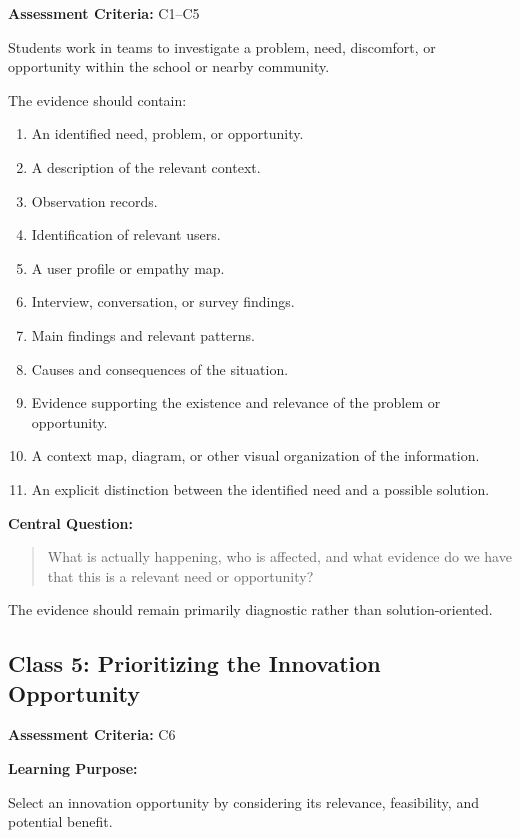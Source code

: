 \documentclass[12pt,a4paper]{article}
\begin{document}
	\textbf{Assessment Criteria:} C1--C5
	
	Students work in teams to investigate a problem, need, discomfort, or opportunity within the school or nearby community.
	
	The evidence should contain:
	
	\begin{enumerate}
		\item An identified need, problem, or opportunity.
		\item A description of the relevant context.
		\item Observation records.
		\item Identification of relevant users.
		\item A user profile or empathy map.
		\item Interview, conversation, or survey findings.
		\item Main findings and relevant patterns.
		\item Causes and consequences of the situation.
		\item Evidence supporting the existence and relevance of the problem or opportunity.
		\item A context map, diagram, or other visual organization of the information.
		\item An explicit distinction between the identified need and a possible solution.
	\end{enumerate}
	
	\textbf{Central Question:}
	
	\begin{quote}
		What is actually happening, who is affected, and what evidence do we have that this is a relevant need or opportunity?
	\end{quote}
	
	The evidence should remain primarily diagnostic rather than solution-oriented.
	
	
	\subsection{Class 5: Prioritizing the Innovation Opportunity}
	
	\textbf{Assessment Criteria:} C6
	
	\textbf{Learning Purpose:}
	
	Select an innovation opportunity by considering its relevance, feasibility, and potential benefit.
	
\end{document}
